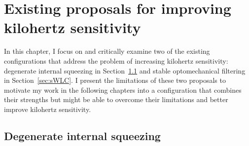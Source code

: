 \chapter{Existing proposals for improving kilohertz sensitivity} %
\label{chp:proposals}

In this chapter, I focus on and critically examine two of the existing configurations that address the problem of increasing kilohertz sensitivity: degenerate internal squeezing in Section~\ref{sec:dIS} and stable optomechanical filtering in Section~\ref{sec:sWLC}.
I present the limitations of these two proposals to motivate my work in the following chapters into a configuration that combines their strengths but might be able to overcome their limitations and better improve kilohertz sensitivity. 


\section{Degenerate internal squeezing}
\label{sec:dIS}

